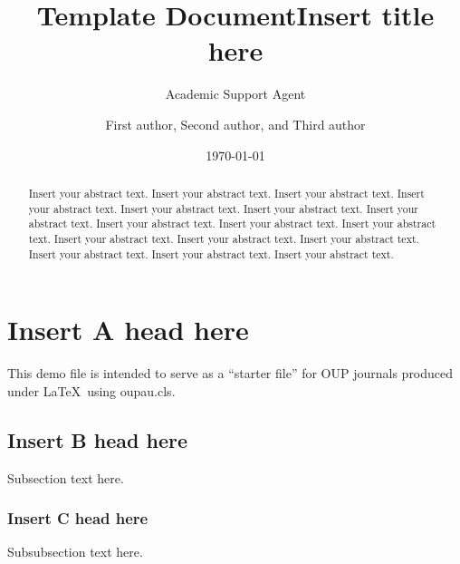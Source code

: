 \documentclass{article}
\title{Template Document}
\author{Academic Support Agent}
\date{\today}
\begin{document}
\maketitle


\title{Insert title here}

\author{First author,
Second author,  and  Third author\corrauth}

\address{Insert address here\\
Insert address here}

\begin{abstract}
Insert your abstract text. Insert your abstract text. Insert your abstract text. Insert your abstract text.
Insert your abstract text. Insert your abstract text. Insert your abstract text. Insert your abstract text.
Insert your abstract text. Insert your abstract text. Insert your abstract text. Insert your abstract text.
Insert your abstract text. Insert your abstract text. Insert your abstract text. Insert your abstract text.
\end{abstract}



\maketitle

%

\section{Insert A head here}
This demo file is intended to serve as a ``starter file''
for OUP journals produced under \LaTeX\ using oupau.cls.

\subsection{Insert B head here}
Subsection text here.


\subsubsection{Insert C head here}
Subsubsection text here.
\end{document}
